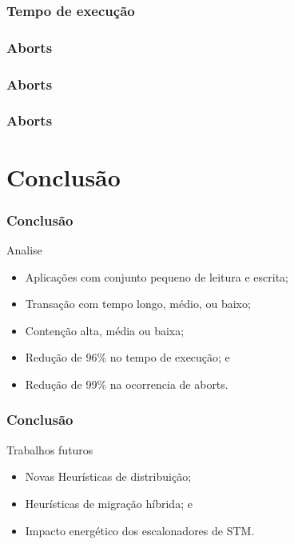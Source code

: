 \documentclass[10pt, pdf,xcolor=pdftex,dvipsnames,table]{beamer}
\begin{document}
\begin{frame} \frametitle{Tempo de execução}
    
\end{frame}

\begin{frame} \frametitle{Aborts}
    
\end{frame}

\begin{frame} \frametitle{Aborts}
    
\end{frame}

\begin{frame} \frametitle{Aborts}
    
\end{frame}

\section{Conclusão}
\begin{frame} \frametitle{Conclusão}
    \begin{block}{Analise}
        \begin{itemize}
        	\item Aplicações com conjunto pequeno de leitura e escrita;
        	\item Transação com tempo longo, médio, ou baixo;
        	\item Contenção alta, média ou baixa;
        	\item Redução de 96\% no tempo de execução; e
        	\item Redução de 99\% na ocorrencia de aborts.
        \end{itemize}
    \end{block}
\end{frame}

\begin{frame} \frametitle{Conclusão}
    \begin{block}{Trabalhos futuros}
        \begin{itemize}
        	\item Novas Heurísticas de distribuição;
        	\item Heurísticas de migração híbrida; e
        	\item Impacto energético dos escalonadores de STM.
        \end{itemize}
    \end{block}
\end{frame}

\end{document}
